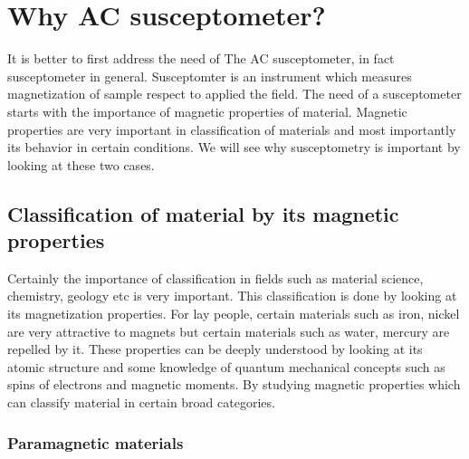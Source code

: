 

\section{Why AC susceptometer?}
It is better to first address the need of The AC susceptometer, in fact susceptometer in general. Susceptomter is an instrument which measures magnetization of sample respect to applied the field. The need of a susceptometer starts with the importance of magnetic properties of material. Magnetic properties are very important in classification of materials and most importantly its behavior in certain conditions. We will see why susceptometry is important by looking at these two cases.

\subsection{Classification of material by its magnetic properties}
Certainly the importance of classification in fields such as material science, chemistry, geology etc is very important. This classification is done by looking at its magnetization properties. For lay people, certain materials such as iron, nickel  are very attractive to magnets but certain materials such as water, mercury are repelled by it. These properties can be deeply understood by looking at its atomic structure and some knowledge of quantum mechanical concepts such as spins of electrons and magnetic moments. By studying magnetic properties which can classify material in certain broad categories.

\subsubsection{Paramagnetic materials}

